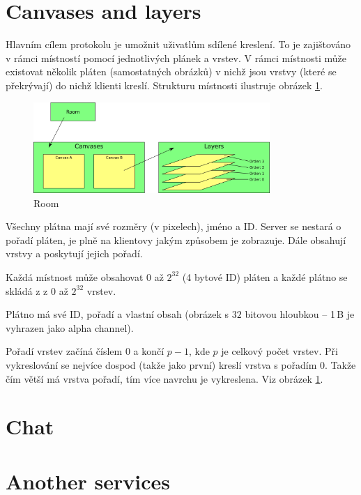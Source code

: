 \section{Canvases and layers}

Hlavním cílem protokolu je umožnit uživatlům sdílené kreslení. To je zajištováno v rámci místností pomocí jednotlivých plánek a vrstev. V rámci místnosti může existovat několik pláten (samostatných obrázků) v nichž jsou vrstvy (které se překrývají) do nichž klienti kreslí. Strukturu místnosti ilustruje obrázek \ref{server.pictures.room}.

\begin{figure}[h]
  \centering
  \includegraphics[width=0.80\textwidth]{diagrams/room.png}
  \caption{Room}
  \label{server.pictures.room}
\end{figure}

Všechny plátna mají své rozměry (v pixelech), jméno a ID. Server se nestará o pořadí pláten, je plně na klientovy jakým způsobem je zobrazuje. Dále obsahují vrstvy a poskytují jejich pořadí.

Každá místnost může obsahovat $0$ až $2^{32}$ (4 bytové ID) pláten a každé plátno se skládá z z $0$ až $2^{32}$ vrstev.

Plátno má své ID, pořadí a vlastní obsah (obrázek s $32$ bitovou hloubkou -- 1\,{}B je vyhrazen jako alpha channel).

Pořadí vrstev začíná číslem $0$ a končí $p - 1$, kde $p$ je celkový počet vrstev. Při vykreslování se nejvíce dospod (takže jako první) kreslí vrstva s pořadím $0$. Takže čím větší má vrstva pořadí, tím více navrchu je vykreslena. Viz obrázek \ref{server.pictures.room}.

\section{Chat}

\section{Another services}



